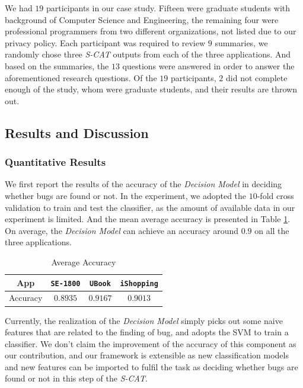 \documentclass[10pt,conference]{IEEEtran}
\begin{document}
We had $19$ participants in our case study. Fifteen were graduate students with background of Computer Science and Engineering, the remaining
four were professional programmers from two different organizations, not listed due to our privacy policy. Each participant was required to review
$9$ summaries, we randomly chose three \emph{S-CAT} outputs from each of the three applications. And based on the summaries, the
$13$ questions were answered in order to answer the aforementioned research questions. Of the $19$ participants, $2$ did not
complete enough of the study, whom were graduate students, and their results are thrown out.

\subsection{Results and Discussion}

\subsubsection{Quantitative Results}

We first report the results of the accuracy of the \emph{Decision Model} in deciding whether bugs are found or not.
In the experiment, we adopted the $10$-fold cross validation to train and test the classifier, as the amount of available
data in our experiment is limited. And the mean average accuracy is presented in Table \ref{tab:acc}. On average,
the \emph{Decision Model} can achieve an accuracy around $0.9$ on all the three applications.

\begin{table}[h]
\centering
\small
\caption{Average Accuracy}
\begin{tabular}{cccc}
\hline
App & \texttt{SE-1800} & \texttt{UBook} & \texttt{iShopping} \\ \hline
Accuracy & $0.8935$ & $0.9167$ & $0.9013$ \\ \hline
\end{tabular}
\label{tab:acc}
\end{table}

Currently, the realization of the \emph{Decision Model} simply picks out some naive features that are related to the finding
of bug, and adopts the SVM to train a classifier. We don't claim the improvement of the accuracy of this component as our contribution,
and our framework is extensible as new classification models and new features can be imported to fulfil the task as deciding
whether bugs are found or not in this step of the \emph{S-CAT}.
\end{document}
